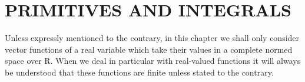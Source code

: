 \section{PRIMITIVES AND INTEGRALS}

Unless expressly mentioned to the contrary, in this chapter we shall only consider vector functions of a real variable which take their values in a complete normed space over R. When we deal in particular with real-valued functions it will always be understood that these functions are finite unless stated to the contrary.

